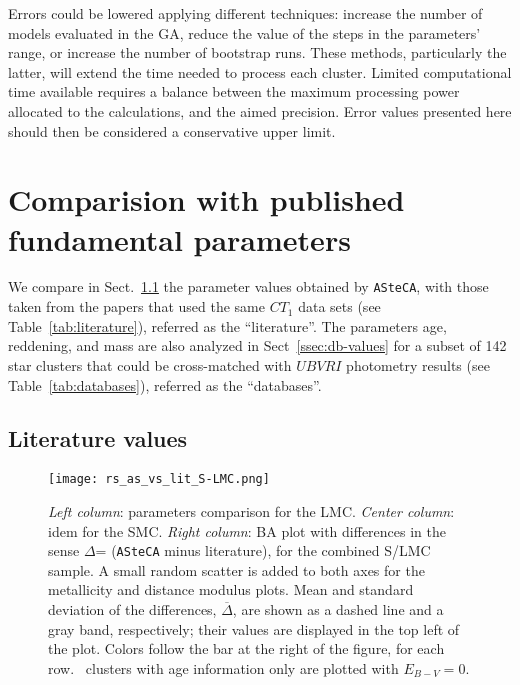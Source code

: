\documentclass{aa}
\begin{document}
Errors could be lowered applying different techniques: increase the
number of models evaluated in the GA, reduce the value of the steps in the
parameters' range, or increase the number of bootstrap runs.
%
These methods, particularly the latter, will extend the time needed to process
each cluster. Limited computational time available requires a balance between
the maximum processing power allocated to the calculations, and the aimed
precision. Error values presented here should then be considered a conservative
upper limit.





\section{Comparision with published fundamental parameters}
\label{sec:comp-pub-data}

We compare in Sect.~\ref{ssec:lit-values} the parameter values obtained by
\texttt{ASteCA}, with those taken from the papers that used the same
$CT_1$ data sets (see Table~\ref{tab:literature}), referred as the
``literature''.
%
The parameters age, reddening, and mass are also analyzed in
Sect~\ref{ssec:db-values} for a subset of 142 star clusters that could be
cross-matched with $UBVRI$ photometry results (see Table~\ref{tab:databases}),
referred as the ``databases''.

  

\subsection{Literature values}
\label{ssec:lit-values}

\begin{figure*}
\texttt{[image: rs\_as\_vs\_lit\_S-LMC.png]}
\caption{\emph{Left column}: parameters comparison for the LMC.\@
\emph{Center column}: idem for the SMC.\@
\emph{Right column}: BA plot with differences in the sense $\Delta$= (\texttt
{ASteCA} minus literature), for the combined S/LMC sample.
A small random scatter is added to both axes for the metallicity and distance
modulus plots. Mean and standard deviation of the differences,
$\overline{\Delta}$, are shown as a dashed line and a gray band, respectively;
their values are displayed in the top left of the plot.
Colors follow the bar at the right of the figure, for each row.~\cite
{Piatti_2011b} clusters with age information only are plotted
with $E_{B-V}{=}0$.}
\label{fig:as_vs_lit}
\end{figure*}
\end{document}
